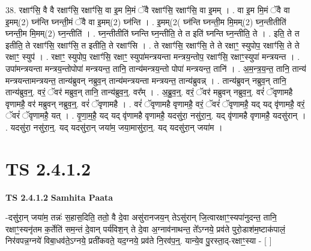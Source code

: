\documentclass[17pt]{extarticle}
\begin{document}
38. रक्षाꣳ॑सि॒ वै वै रक्षाꣳ॑सि॒ रक्षाꣳ॑सि॒ वा इ॒म मि॒मं ॅवै रक्षाꣳ॑सि॒ रक्षाꣳ॑सि॒ वा इ॒मम् । . वा इ॒म मि॒मं ॅवै वा इ॒मम्(2) घ्न॑न्ति घ्नन्ती॒मं ॅवै वा इ॒मम्(2) घ्न॑न्ति । . इ॒मम्(2( घ्न॑न्ति घ्नन्ती॒म मि॒मम्(2) घ्न॒न्तीतीति॑ घ्नन्ती॒म मि॒मम्(2) घ्न॒न्तीति॑ । . घ्न॒न्तीतीति॑ घ्नन्ति घ्न॒न्तीति॒ ते त इति॑ घ्नन्ति घ्न॒न्तीति॒ ते । . इति॒ ते त इतीति॒ ते रक्षाꣳ॑सि॒ रक्षाꣳ॑सि॒ त इतीति॒ ते रक्षाꣳ॑सि । . ते रक्षाꣳ॑सि॒ रक्षाꣳ॑सि॒ ते ते रक्षाꣳ॒॒ स्युपोप॒ रक्षाꣳ॑सि॒ ते ते रक्षाꣳ॒॒ स्युप॑ । . रक्षाꣳ॒॒ स्युपोप॒ रक्षाꣳ॑सि॒ रक्षाꣳ॒॒ स्युपा॑मन्त्रयन्ता मन्त्रय॒न्तोप॒ रक्षाꣳ॑सि॒ रक्षाꣳ॒॒स्युपा॑ मन्त्रयन्त । . उपा॑मन्त्रयन्ता मन्त्रय॒न्तोपोपा॑ मन्त्रयन्त॒ तानि॒ तान्य॑मन्त्रय॒न्तो पोपा॑ मन्त्रयन्त॒ तानि॑ । . अ॒म॒न्त्र॒य॒न्त॒ तानि॒ तान्य॑ मन्त्रयन्तामन्त्रयन्त॒ तान्य॑ब्रुवन् नब्रुव॒न् तान्य॑मन्त्रयन्ता मन्त्रयन्त॒ तान्य॑ब्रुवन्न् । . तान्य॑ब्रुवन् नब्रुव॒न् तानि॒ तान्य॑ब्रुव॒न्॒. वरं॒ ॅवर॑ मब्रुव॒न् तानि॒ तान्य॑ब्रुव॒न्॒. वर᳚म् । . अ॒ब्रु॒व॒न्॒. वरं॒ ॅवर॑ मब्रुवन् नब्रुव॒न्॒. वरं॑ ॅवृणामहै वृणामहै॒ वर॑ मब्रुवन् नब्रुव॒न्॒. वरं॑ ॅवृणामहै । . वरं॑ ॅवृणामहै वृणामहै॒ वरं॒ ॅवरं॑ ॅवृणामहै॒ यद् यद् वृ॑णामहै॒ वरं॒ ॅवरं॑ ॅवृणामहै॒ यत् । . वृ॒णा॒म॒है॒ यद् यद् वृ॑णामहै वृणामहै॒ यदसु॑रा॒ नसु॑रा॒न्॒. यद् वृ॑णामहै वृणामहै॒ यदसु॑रान् । . यदसु॑रा॒ नसु॑रा॒न्॒. यद् यदसु॑रा॒न् जया॑म॒ जया॒मासु॑रा॒न्॒. यद् यदसु॑रा॒न् जया॑म । \newline
\pagebreak
{}
\section*{ TS 2.4.1.2 }

\textbf{TS 2.4.1.2 } \newline
\textbf{Samhita Paata} \newline

-दसु॑रा॒न् जया॑म॒ तन्नः॑ स॒हास॒दिति॒ ततो॒ वै दे॒वा असु॑रानजय॒न् तेऽसु॑रान् जि॒त्वारक्षाꣳ॒॒स्यपा॑नुदन्त॒ तानि॒ रक्षाꣳ॒॒स्यनृ॑तम क॒र्तेति॑ सम॒न्तं दे॒वान् पर्य॑विश॒न् ते दे॒वा अ॒ग्नाव॑नाथन्त॒ ते᳚ऽग्नये॒ प्रव॑ते पुरो॒डाश॑म॒ष्टाक॑पालं॒ निर॑वपन्न॒ग्नये॑ विबा॒धव॑ते॒ऽग्नये॒ प्रती॑कवते॒ यद॒ग्नये॒ प्रव॑ते नि॒रव॑प॒न्॒. यान्ये॒व पु॒रस्ता॒द्-रक्षाꣳ॒॒स्या - [  ] \newline
\end{document}
